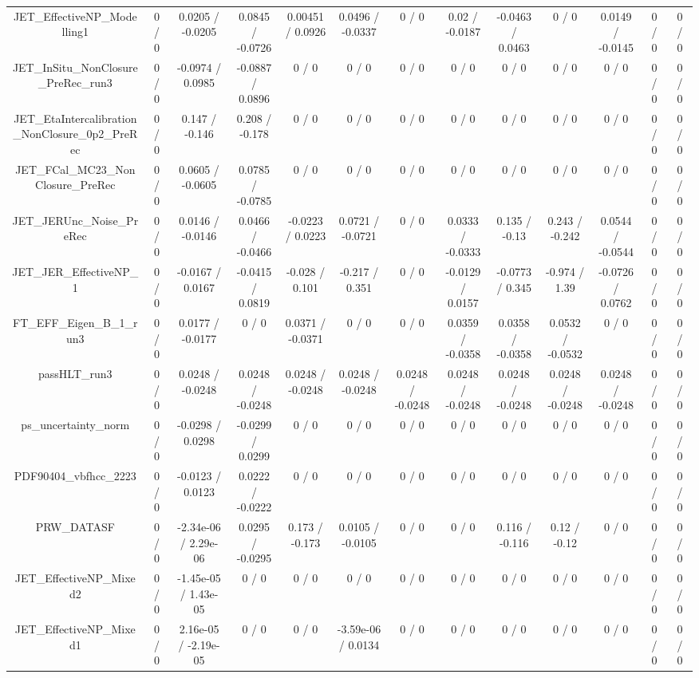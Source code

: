 \documentclass[10pt]{article}
\begin{document}
\begin{table}[htbp]
\begin{center}
\begin{tabular}{|c|c|c|c|c|c|c|c|c|c|c|c|c|}
  JET_EffectiveNP_Modelling1 & 0 / 0 & 0.0205 / -0.0205 & 0.0845 / -0.0726 & 0.00451 / 0.0926 & 0.0496 / -0.0337 & 0 / 0 & 0.02 / -0.0187 & -0.0463 / 0.0463 & 0 / 0 & 0.0149 / -0.0145 & 0 / 0 & 0 / 0 \\ 
  JET_InSitu_NonClosure_PreRec_run3 & 0 / 0 & -0.0974 / 0.0985 & -0.0887 / 0.0896 & 0 / 0 & 0 / 0 & 0 / 0 & 0 / 0 & 0 / 0 & 0 / 0 & 0 / 0 & 0 / 0 & 0 / 0 \\ 
  JET_EtaIntercalibration_NonClosure_0p2_PreRec & 0 / 0 & 0.147 / -0.146 & 0.208 / -0.178 & 0 / 0 & 0 / 0 & 0 / 0 & 0 / 0 & 0 / 0 & 0 / 0 & 0 / 0 & 0 / 0 & 0 / 0 \\ 
  JET_FCal_MC23_NonClosure_PreRec & 0 / 0 & 0.0605 / -0.0605 & 0.0785 / -0.0785 & 0 / 0 & 0 / 0 & 0 / 0 & 0 / 0 & 0 / 0 & 0 / 0 & 0 / 0 & 0 / 0 & 0 / 0 \\ 
  JET_JERUnc_Noise_PreRec & 0 / 0 & 0.0146 / -0.0146 & 0.0466 / -0.0466 & -0.0223 / 0.0223 & 0.0721 / -0.0721 & 0 / 0 & 0.0333 / -0.0333 & 0.135 / -0.13 & 0.243 / -0.242 & 0.0544 / -0.0544 & 0 / 0 & 0 / 0 \\ 
  JET_JER_EffectiveNP_1 & 0 / 0 & -0.0167 / 0.0167 & -0.0415 / 0.0819 & -0.028 / 0.101 & -0.217 / 0.351 & 0 / 0 & -0.0129 / 0.0157 & -0.0773 / 0.345 & -0.974 / 1.39 & -0.0726 / 0.0762 & 0 / 0 & 0 / 0 \\ 
  FT_EFF_Eigen_B_1_run3 & 0 / 0 & 0.0177 / -0.0177 & 0 / 0 & 0.0371 / -0.0371 & 0 / 0 & 0 / 0 & 0.0359 / -0.0358 & 0.0358 / -0.0358 & 0.0532 / -0.0532 & 0 / 0 & 0 / 0 & 0 / 0 \\ 
  passHLT_run3 & 0 / 0 & 0.0248 / -0.0248 & 0.0248 / -0.0248 & 0.0248 / -0.0248 & 0.0248 / -0.0248 & 0.0248 / -0.0248 & 0.0248 / -0.0248 & 0.0248 / -0.0248 & 0.0248 / -0.0248 & 0.0248 / -0.0248 & 0 / 0 & 0 / 0 \\ 
  ps_uncertainty_norm & 0 / 0 & -0.0298 / 0.0298 & -0.0299 / 0.0299 & 0 / 0 & 0 / 0 & 0 / 0 & 0 / 0 & 0 / 0 & 0 / 0 & 0 / 0 & 0 / 0 & 0 / 0 \\ 
  PDF90404_vbfhcc_2223 & 0 / 0 & -0.0123 / 0.0123 & 0.0222 / -0.0222 & 0 / 0 & 0 / 0 & 0 / 0 & 0 / 0 & 0 / 0 & 0 / 0 & 0 / 0 & 0 / 0 & 0 / 0 \\ 
  PRW_DATASF & 0 / 0 & -2.34e-06 / 2.29e-06 & 0.0295 / -0.0295 & 0.173 / -0.173 & 0.0105 / -0.0105 & 0 / 0 & 0 / 0 & 0.116 / -0.116 & 0.12 / -0.12 & 0 / 0 & 0 / 0 & 0 / 0 \\ 
  JET_EffectiveNP_Mixed2 & 0 / 0 & -1.45e-05 / 1.43e-05 & 0 / 0 & 0 / 0 & 0 / 0 & 0 / 0 & 0 / 0 & 0 / 0 & 0 / 0 & 0 / 0 & 0 / 0 & 0 / 0 \\ 
  JET_EffectiveNP_Mixed1 & 0 / 0 & 2.16e-05 / -2.19e-05 & 0 / 0 & 0 / 0 & -3.59e-06 / 0.0134 & 0 / 0 & 0 / 0 & 0 / 0 & 0 / 0 & 0 / 0 & 0 / 0 & 0 / 0 \\ 

\end{tabular}
\end{center}
\end{table}
\end{document}
